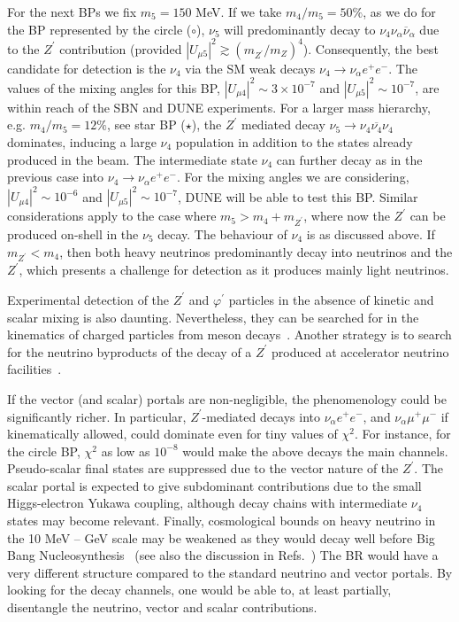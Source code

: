 For the next BPs we fix $m_5 = 150$ MeV. If we take $m_4/m_5 = 50\%$, as we do for the BP represented by the circle ($\circ$), $\nu_5$ will predominantly decay to $\nu_4 \nu_\alpha \overline{\nu}_\alpha$ due to the $Z^\prime$ contribution (provided $|U_{\mu 5}|^2\gtrsim \left( m_{Z^\prime}/m_{Z} \right)^4$). Consequently, the best candidate for detection is the $\nu_4$ via the SM weak decays $\nu_4 \to \nu_\alpha e^+e^-$. The values of the mixing angles for this BP, $|U_{\mu 4}|^2 \sim 3\times 10^{-7}$ and $|U_{\mu 5}|^2 \sim 10^{-7}$, are within reach of the SBN and DUNE experiments. 
For a larger mass hierarchy, e.g. $m_4/m_5 = 12\%$, see star BP ($\star$), the $Z^\prime$ mediated decay $\nu_5 \to \nu_4 \overline{\nu_4} \nu_4$ dominates, inducing a large $\nu_4$ population in addition to the states already produced in the beam. The intermediate state $\nu_4$ can further decay as in the previous case into $\nu_4 \to \nu_\alpha e^+e^-$. For the mixing angles we are considering, $|U_{\mu 4}|^2 \sim 10^{-6}$ and $|U_{\mu 5}|^2 \sim 10^{-7}$, DUNE will be able to test this BP. Similar considerations apply to the case where $m_5 > m_4 + m_{Z^\prime}$, where now the $Z^\prime$ can be produced on-shell in the $\nu_5$ decay. The behaviour of $\nu_4$ is as discussed above. If $ m_{Z^\prime} < m_4$, then both heavy neutrinos predominantly decay into neutrinos and the $Z^\prime$, which presents a challenge for detection as it produces mainly light neutrinos.

Experimental detection of the $Z^\prime$ and $\varphi^\prime$ particles in the absence of kinetic and scalar mixing is also daunting. Nevertheless, they can be searched for in the kinematics of charged particles from meson decays~\cite{Laha:2013xua,Bakhti:2017jhm}. Another strategy is to search for the neutrino byproducts of the decay of a $Z^\prime$ produced at accelerator neutrino facilities~\cite{Bakhti:2018avv}. 

If the vector (and scalar) portals are non-negligible, the phenomenology could be significantly richer. In particular, $Z^\prime$-mediated decays into $\nu_\alpha e^+ e^-$, and $\nu_\alpha \mu^+ \mu^-$ if kinematically allowed, could dominate even for tiny values of $\chi^2$. For instance, for the circle BP, $\chi^2 $ as low as $10^{-8}$ would make the above decays the main channels. Pseudo-scalar final states are suppressed due to the vector nature of the $Z^\prime$. The scalar portal is expected to give subdominant contributions due to the small Higgs-electron Yukawa coupling, although decay chains with intermediate $\nu_4$ states may become relevant. Finally, cosmological bounds on heavy neutrino in the 10 MeV -- GeV scale may be weakened as they would decay well before Big Bang Nucleosynthesis~\cite{Dolgov:2000jw} (see also the discussion in Refs.~\cite{Hannestad:2013ana,Dasgupta:2013zpn,Mirizzi:2014ama,Chu:2015ipa,Cherry:2016jol,Chu:2018gxk,Song:2018zyl}) The BR would have a very different structure compared to the standard neutrino and vector portals. By looking for the decay channels, one would be able to, at least partially, disentangle the neutrino, vector and scalar contributions.

